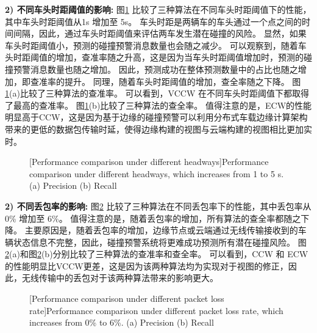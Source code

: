 \textbf{2) 不同车头时距阈值的影响:}
图\ref{fig 5-6} 比较了三种算法在不同车头时距阈值下的性能，其中车头时距阈值从1s 增加至 5s。
车头时距是两辆车的车头通过一个点之间的时间间隔，因此，通过车头时距阈值来评估两车发生潜在碰撞的风险。
显然，如果车头时距阈值小，预测的碰撞预警消息数量也会随之减少。
可以观察到，随着车头时距阈值的增加，查准率随之升高，这是因为当车头时距阈值增加时，预测的碰撞预警消息数量也随之增加。
因此，预测成功在整体预测数量中的占比也随之增加，即查准率的提升。
同理，随着车头时距阈值的增加，查全率随之下降。
图\ref{fig 5-6}(a)比较了三种算法的查准率。
可以看到，VCCW 在不同车头时距阈值下都取得了最高的查准率。
图\ref{fig 5-6}(b)比较了三种算法的查全率。
值得注意的是，ECW的性能明显高于CCW，这是因为基于边缘的碰撞预警可以利用分布式车载边缘计算架构带来的更低的数据包传输时延，使得边缘构建的视图与云端构建的视图相比更加实时。

\begin{figure}[h]
     \centering
     [Performance comparison under different headways]{Performance comparison under different headways, which increases from 1 to 5 s. (a) Precision (b) Recall}
     \label{fig 5-6}
\end{figure}

\textbf{2) 不同丢包率的影响:}
图\ref{fig 5-7} 比较了三种算法在不同丢包率下的性能，其中丢包率从 0\% 增加至 6\%。
值得注意的是，随着丢包率的增加，所有算法的查全率都随之下降。
主要原因是，随着丢包率的增加，边缘节点或云端通过无线传输接收到的车辆状态信息不完整，因此，碰撞预警系统将更难成功预测所有潜在碰撞风险。
图\ref{fig 5-7}(a)和图\ref{fig 5-7}(b)分别比较了三种算法的查准率和查全率。
可以看到，CCW 和 ECW的性能明显比VCCW更差，这是因为该两种算法均为实现对于视图的修正，因此，无线传输中的丢包对于该两种算法带来的影响更大。

\begin{figure}[h]
     \centering
     [Performance comparison under different packet loss rate]{Performance comparison under different packet loss rate, which increases from 0\% to 6\%. (a) Precision (b) Recall}
     \label{fig 5-7}
\end{figure}

